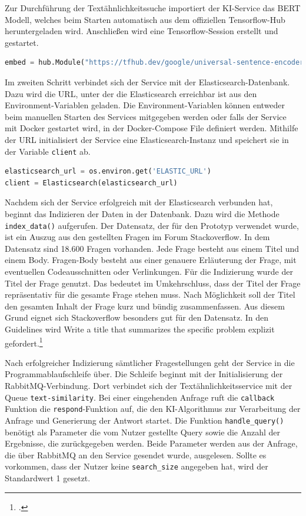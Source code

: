 Zur Durchführung der Textähnlichkeitssuche importiert der KI-Service das BERT Modell, welches beim Starten automatisch aus dem offiziellen Tensorflow-Hub heruntergeladen wird. Anschließen wird eine Tensorflow-Session erstellt und gestartet. 

\begin{lstlisting}[language=Python, caption={Laden des BERT-Modells}]
embed = hub.Module("https://tfhub.dev/google/universal-sentence-encoder/2")
\end{lstlisting}

Im zweiten Schritt verbindet sich der Service mit der Elasticsearch-Datenbank. Dazu wird die URL, unter der die Elasticsearch erreichbar ist aus den Environment-Variablen geladen. Die Environment-Variablen können entweder beim manuellen Starten des Services mitgegeben werden oder falls der Service mit Docker gestartet wird, in der Docker-Compose File definiert werden. Mithilfe der URL initialisiert der Service eine Elasticsearch-Instanz und speichert sie in der Variable \texttt{client} ab. 

\begin{lstlisting}[language=Python, caption={Starten der Elasticsearch-Instanz}]
elasticsearch_url = os.environ.get('ELASTIC_URL')
client = Elasticsearch(elasticsearch_url)
\end{lstlisting}

Nachdem sich der Service erfolgreich mit der Elasticsearch verbunden hat, beginnt das Indizieren der Daten in der Datenbank. Dazu wird die Methode \texttt{index\_{}data()} aufgerufen. Der Datensatz, der für den Prototyp verwendet wurde, ist ein Auszug aus den gestellten Fragen im Forum Stackoverflow. In dem Datensatz sind 18.600 Fragen vorhanden. Jede Frage besteht aus einem Titel und einem Body. Fragen-Body besteht aus einer genauere Erläuterung der Frage, mit eventuellen Codeausschnitten oder Verlinkungen. Für die Indizierung wurde der Titel der Frage genutzt. Das bedeutet im Umkehrschluss, dass der Titel der Frage repräsentativ für die gesamte Frage stehen muss. Nach Möglichkeit soll der Titel den gesamten Inhalt der Frage kurz und bündig zusammenfassen. Aus diesem Grund eignet sich Stackoverflow besonders gut für den Datensatz. In den Guidelines wird \glqq Write a title that summarizes the specific problem\grqq{} explizit gefordert.\footcite{stackoverflow2022question}

Nach erfolgreicher Indizierung sämtlicher Fragestellungen geht der Service in die Programmablaufschleife über. Die Schleife beginnt mit der Initialisierung der RabbitMQ-Verbindung. Dort verbindet sich der Textähnlichkeitsservice mit der Queue \texttt{text-similarity}. Bei einer eingehenden Anfrage ruft die \texttt{callback} Funktion die \texttt{respond}-Funktion auf, die den KI-Algorithmus zur Verarbeitung der Anfrage und Generierung der Antwort startet. Die Funktion \texttt{handle\_{}query()} benötigt als Parameter die vom Nutzer gestellte Query sowie die Anzahl der Ergebnisse, die zurückgegeben werden. Beide Parameter werden aus der Anfrage, die über RabbitMQ an den Service gesendet wurde, ausgelesen. Sollte es vorkommen, dass der Nutzer keine \texttt{search\_{}size} angegeben hat, wird der Standardwert 1 gesetzt.
 
